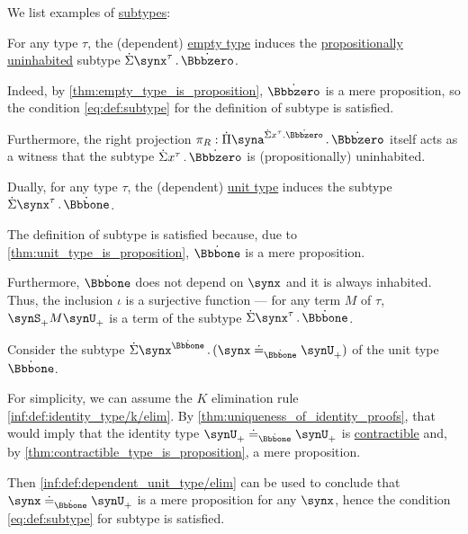 \begin{example}\label{ex:def:subtype}
  We list examples of \hyperref[def:subtype]{subtypes}:
  \begin{thmenum}
     For any type \( \tau \), the (dependent) \hyperref[def:dependent_empty_type]{empty type} induces the \hyperref[def:propositionally_uninhabited]{propositionally uninhabited} subtype \( \qsum {\synx^\tau} \syn\Bbbzero \).

    Indeed, by \cref{thm:empty_type_is_proposition}, \( \syn\Bbbzero \) is a mere proposition, so the condition \eqref{eq:def:subtype} for the definition of subtype is satisfied.

    Furthermore, the right projection \( \pi_R: \qprod {\syna^{\qsum {x^\tau} \syn\Bbbzero}} \syn\Bbbzero \) itself acts as a witness that the subtype \( \qsum {x^\tau} \syn\Bbbzero \) is (propositionally) uninhabited.

     Dually, for any type \( \tau \), the (dependent) \hyperref[def:dependent_unit_type]{unit type} induces the subtype \( \qsum {\synx^\tau} \syn\Bbbone \).

    The definition of subtype is satisfied because, due to \cref{thm:unit_type_is_proposition}, \( \syn\Bbbone \) is a mere proposition.

    Furthermore, \( \syn\Bbbone \) does not depend on \( \synx \) and it is always inhabited. Thus, the inclusion \( \iota \) is a surjective function --- for any term \( M \) of \( \tau \), \( \synS_+ M \synU_+ \) is a term of the subtype \( \qsum {\synx^\tau} \syn\Bbbone \).

     Consider the subtype \( \qsum {\synx^{\syn\Bbbone}} (\synx \syneq_{\syn\Bbbone} \synU_+) \) of the unit type \( \syn\Bbbone \).

    For simplicity, we can assume the \( K \) elimination rule \ref{inf:def:identity_type/k/elim}. By \cref{thm:uniqueness_of_identity_proofs}, that would imply that the identity type \( \synU_+ \syneq_{\syn\Bbbone} \synU_+ \) is \hyperref[def:contractible_type]{contractible} and, by \cref{thm:contractible_type_is_proposition}, a mere proposition.

    Then \ref{inf:def:dependent_unit_type/elim} can be used to conclude that \( \synx \syneq_{\syn\Bbbone} \synU_+ \) is a mere proposition for any \( \synx \), hence the condition \eqref{eq:def:subtype} for subtype is satisfied.
  \end{thmenum}
\end{example}

